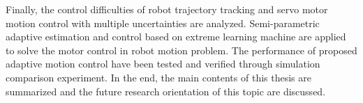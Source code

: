 \begin{englishabstract}
Finally, the control difficulties of robot trajectory tracking and servo motor motion control with multiple uncertainties are analyzed. Semi-parametric adaptive estimation and control based on extreme learning machine are applied to solve the motor control in robot motion problem. The performance of proposed adaptive motion control have been tested and verified through simulation comparison experiment. In the end, the main contents of this thesis are summarized and the future research orientation of this topic are discussed.
   

\end{englishabstract}
